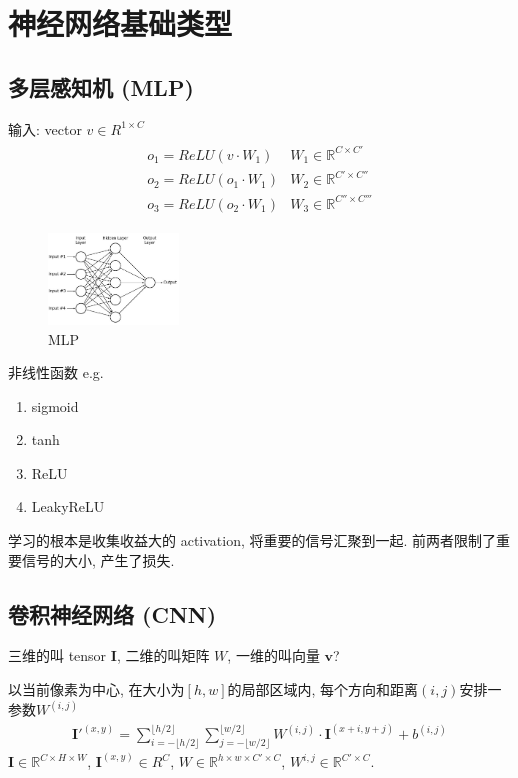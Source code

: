 \newpage
\section{神经网络基础类型}

\subsection{多层感知机 (MLP)}
输入: vector $v\in R^{1\times C}$
\begin{align*}
    \begin{array}{ll}
        o_1=ReLU(v\cdot W_1) & W_1 \in \mathbb{R}^{C\times C'}\\
        o_2=ReLU(o_1\cdot W_1) & W_2 \in \mathbb{R}^{C'\times C''}\\
        o_3=ReLU(o_2\cdot W_1) & W_3 \in \mathbb{R}^{C''\times C'''}
    \end{array}
\end{align*}

\begin{figure}[!htb]
    \centering
    \includegraphics[width=0.309\textwidth]{pic/DL2/MLP.jpg}
    \caption{MLP}
\end{figure}


非线性函数 e.g.
\begin{enumerate}
    \item sigmoid
    \item tanh
    \item ReLU
    \item LeakyReLU
\end{enumerate}

学习的根本是收集收益大的 activation, 将重要的信号汇聚到一起. 前两者限制了重要信号的大小, 产生了损失. 

\subsection{卷积神经网络 (CNN)}
三维的叫 tensor $\mathbf{I}$, 二维的叫矩阵 $W$, 一维的叫向量 $\mathbf{v}$?


以当前像素为中心, 在大小为$[h,w]$的局部区域内, 每个方向和距离$(i, j)$安排一参数$W^{(i,j)}$
\begin{align*}
    \mathbf{I}'^{(x,y)}=\sum_{i=-\lfloor h/2\rfloor}^{\lfloor h/2\rfloor}\sum_{j=-\lfloor w/2\rfloor}^{\lfloor w/2\rfloor}W^{(i,j)}\cdot \mathbf{I}^{(x+i, y+j)}+b^{(i,j)}
\end{align*}
$\mathbf{I}\in \mathbb{R}^{C\times H\times W}$, $\mathbf{I}^{(x,y)}\in R^{C}$, $W \in \mathbb{R}^{h\times w\times C' \times C}$, $W^{i,j}\in \mathbb{R}^{C'\times C}$. 

